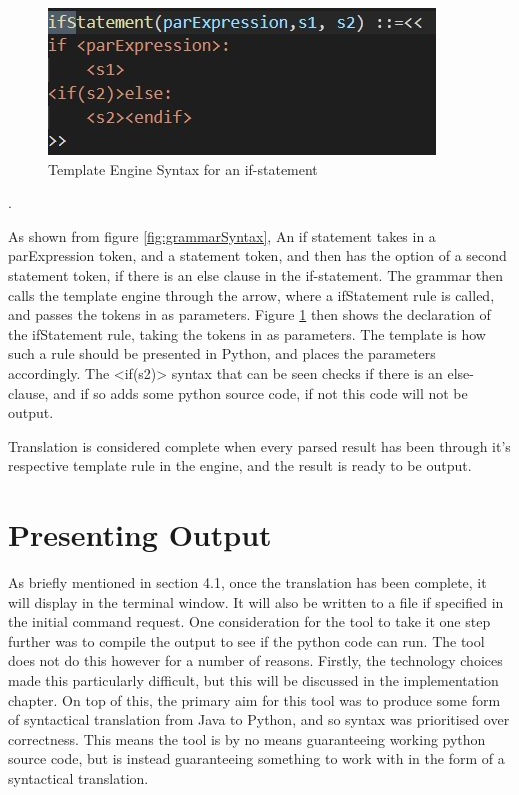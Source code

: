 \documentclass{l4proj}
\begin{document}
\begin{figure}[htb]
    \centering
    \includegraphics[width=1\linewidth]{images/templateSyntax.JPG}
        \caption{Template Engine Syntax for an if-statement
    }
    \label{fig:templateSyntax} 
\end{figure}.

As shown from figure \ref{fig:grammarSyntax}, An if statement takes in a parExpression token, and a statement token, and then has the option of a second statement token, if there is an else clause in the if-statement. The grammar then calls the template engine through the arrow, where a ifStatement rule is called, and passes the tokens in as parameters.
Figure \ref{fig:templateSyntax} then shows the declaration of the ifStatement rule, taking the tokens in as parameters. The template is how such a rule should be presented in Python, and places the parameters accordingly. The <if(s2)> syntax that can be seen checks if there is an else-clause, and if so adds some python source code, if not this code will not be output.

Translation is considered complete when every parsed result has been through it's respective template rule in the engine, and the result is ready to be output.


\section{Presenting Output}
As briefly mentioned in section 4.1, once the translation has been complete, it will display in the terminal window. It will also be written to a file if specified in the initial command request. One consideration for the tool to take it one step further was to compile the output to see if the python code can run. The tool does not do this however for a number of reasons. Firstly, the technology choices made this particularly difficult, but this will be discussed in the implementation chapter. On top of this, the primary aim for this tool was to produce some form of syntactical translation from Java to Python, and so syntax was prioritised over correctness. This means the tool is by no means guaranteeing working python source code, but is instead guaranteeing something to work with in the form of a syntactical translation. 
\end{document}

